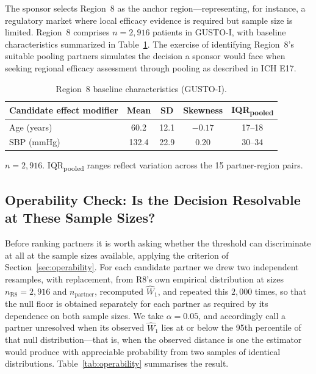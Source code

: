 \documentclass[AMA,Times1COL]{WileyNJDv5}
\begin{document}
The sponsor selects Region~8 as the anchor region---representing, for instance, a regulatory market where local efficacy evidence is required but sample size is limited. Region~8 comprises $n = 2{,}916$ patients in GUSTO-I, with baseline characteristics summarized in Table~\ref{tab:gusto_r8}. The exercise of identifying Region~8's suitable pooling partners simulates the decision a sponsor would face when seeking regional efficacy assessment through pooling as described in ICH E17.\cite{iche17}

\begin{table}[ht]
\centering
\caption{Region~8 baseline characteristics (GUSTO-I).\label{tab:gusto_r8}}
\begin{tabular}{lcccc}
\toprule
\textbf{Candidate effect modifier} & \textbf{Mean} & \textbf{SD} & \textbf{Skewness} & \textbf{IQR\textsubscript{pooled}} \\
\midrule
Age (years) & 60.2 & 12.1 & $-0.17$ & 17--18 \\
SBP (mmHg) & 132.4 & 22.9 & 0.20 & 30--34 \\
\bottomrule
\end{tabular}
\begin{tablenotes}
\item $n = 2{,}916$. IQR\textsubscript{pooled} ranges reflect variation across the 15 partner-region pairs.
\end{tablenotes}
\end{table}

\subsection{Operability Check: Is the Decision Resolvable at These Sample Sizes?}\label{sec:app_operability}

Before ranking partners it is worth asking whether the threshold can discriminate at all at the sample sizes available, applying the criterion of Section~\ref{sec:operability}. For each candidate partner we drew two independent resamples, with replacement, from R8's own empirical distribution at sizes $n_{\text{R8}} = 2{,}916$ and $n_{\text{partner}}$, recomputed $\widehat{W}_1$, and repeated this $2{,}000$ times, so that the null floor is obtained separately for each partner as required by its dependence on both sample sizes. We take $\alpha = 0.05$, and accordingly call a partner unresolved when its observed $\widehat{W}_1$ lies at or below the 95th percentile of that null distribution---that is, when the observed distance is one the estimator would produce with appreciable probability from two samples of identical distributions. Table~\ref{tab:operability} summarises the result.
\end{document}

